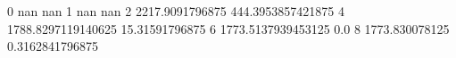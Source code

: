 0 nan nan
1 nan nan
2 2217.9091796875 444.3953857421875
4 1788.8297119140625 15.31591796875
6 1773.5137939453125 0.0
8 1773.830078125 0.3162841796875
